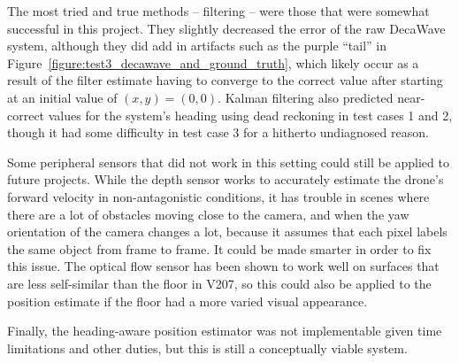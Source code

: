 The most tried and true methods -- filtering -- were those that were somewhat successful in this project.
They slightly decreased the error of the raw DecaWave system,
although they did add in artifacts such as the purple ``tail'' in Figure~\ref{figure:test3_decawave_and_ground_truth},
which likely occur as a result of the filter estimate having to converge to the correct value
after starting at an initial value of $(x,y)=(0,0)$.
Kalman filtering also predicted near-correct values for the system's heading using dead reckoning
in test cases 1 and 2, though it had some difficulty in test case 3 for a hitherto undiagnosed reason.

Some peripheral sensors that did not work in this setting could still be applied to future projects.
While the depth sensor works to accurately estimate the drone's forward velocity in non-antagonistic
conditions, it has trouble in scenes where there are a lot of obstacles moving close to the camera,
and when the yaw orientation of the camera changes a lot, because it assumes that each pixel
labels the same object from frame to frame.
It could be made smarter in order to fix this issue.
The optical flow sensor has been shown to work well on surfaces that are less self-similar than the
floor in V207,
so this could also be applied to the position estimate if the floor had a more varied visual appearance.

Finally, the heading-aware position estimator was not implementable given time limitations
and other duties, but this is still a conceptually viable system.
